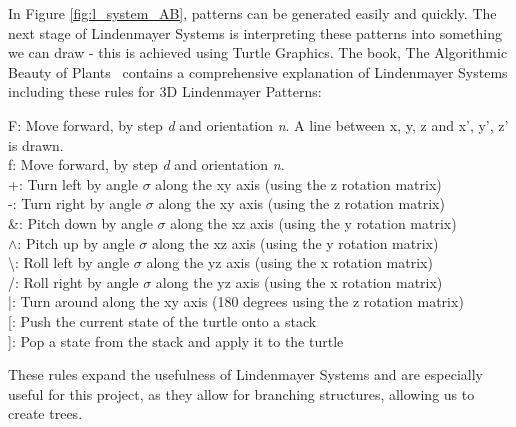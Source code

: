 \documentclass[a4paper,10pt]{report}
\begin{document}
In Figure \ref{fig:l_system_AB}, patterns can be generated easily and quickly. The next stage of Lindenmayer Systems is interpreting these patterns into something we can draw - this is achieved using Turtle Graphics. The book, The Algorithmic Beauty of Plants~\cite{prusinkiewicz2012algorithmic} contains a comprehensive explanation of Lindenmayer Systems including these rules for 3D Lindenmayer Patterns:\medskip


\setlength{\parindent}{1cm}F: Move forward, by step \textit{d} and orientation \textit{n}. A line between {x, y, z} and {x', y', z'} is drawn. \\


\setlength{\parindent}{1cm}f: Move forward, by step \textit{d} and orientation \textit{n}. \\


\setlength{\parindent}{1cm}+: Turn left by angle $\sigma$ along the xy axis (using the z rotation matrix)\\


\setlength{\parindent}{1cm}-: Turn right by angle $\sigma$ along the xy axis (using the z rotation matrix)\\


\setlength{\parindent}{1cm}\&: Pitch down by angle $\sigma$ along the xz axis (using the y rotation matrix)\\


\setlength{\parindent}{1cm}$\wedge$: Pitch up by angle $\sigma$ along the xz axis (using the y rotation matrix)\\


\setlength{\parindent}{1cm}\textbackslash: Roll left by angle $\sigma$ along the yz axis (using the x rotation matrix)\\


\setlength{\parindent}{1cm}/: Roll right by angle $\sigma$ along the yz axis (using the x rotation matrix)\\


\setlength{\parindent}{1cm}|: Turn around along the xy axis (180 degrees using the z rotation matrix)\\


\setlength{\parindent}{1cm}[: Push the current state of the turtle onto a stack\\


\setlength{\parindent}{1cm}]: Pop a state from the stack and apply it to the turtle\medskip


\setlength{\parindent}{0pt}These rules expand the usefulness of Lindenmayer Systems and are especially useful for this project, as they allow for branching structures, allowing us to create trees.
\end{document}
